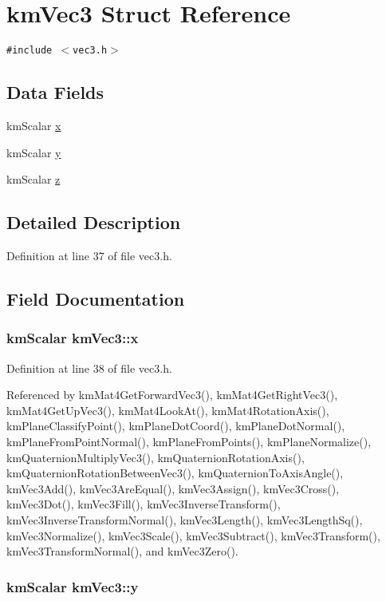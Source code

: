 \hypertarget{structkm_vec3}{
\section{kmVec3 Struct Reference}
\label{structkm_vec3}
}
{\tt \#include $<$vec3.h$>$}

\subsection*{Data Fields}
\begin{CompactItemize}
\item 
kmScalar \hyperlink{structkm_vec3_800c3571e905feddc73453c652be72fb}{x}
\item 
kmScalar \hyperlink{structkm_vec3_45906c9d76262c5a9dd1c3774ee937eb}{y}
\item 
kmScalar \hyperlink{structkm_vec3_539514eaeee81aaeee3bb90f7a1581af}{z}
\end{CompactItemize}


\subsection{Detailed Description}


Definition at line 37 of file vec3.h.

\subsection{Field Documentation}
\hypertarget{structkm_vec3_800c3571e905feddc73453c652be72fb}{
\subsubsection[{x}]{\setlength{\rightskip}{0pt plus 5cm}kmScalar {\bf kmVec3::x}}}
\label{structkm_vec3_800c3571e905feddc73453c652be72fb}




Definition at line 38 of file vec3.h.

Referenced by kmMat4GetForwardVec3(), kmMat4GetRightVec3(), kmMat4GetUpVec3(), kmMat4LookAt(), kmMat4RotationAxis(), kmPlaneClassifyPoint(), kmPlaneDotCoord(), kmPlaneDotNormal(), kmPlaneFromPointNormal(), kmPlaneFromPoints(), kmPlaneNormalize(), kmQuaternionMultiplyVec3(), kmQuaternionRotationAxis(), kmQuaternionRotationBetweenVec3(), kmQuaternionToAxisAngle(), kmVec3Add(), kmVec3AreEqual(), kmVec3Assign(), kmVec3Cross(), kmVec3Dot(), kmVec3Fill(), kmVec3InverseTransform(), kmVec3InverseTransformNormal(), kmVec3Length(), kmVec3LengthSq(), kmVec3Normalize(), kmVec3Scale(), kmVec3Subtract(), kmVec3Transform(), kmVec3TransformNormal(), and kmVec3Zero().\hypertarget{structkm_vec3_45906c9d76262c5a9dd1c3774ee937eb}{
\subsubsection[{y}]{\setlength{\rightskip}{0pt plus 5cm}kmScalar {\bf kmVec3::y}}}
\label{structkm_vec3_45906c9d76262c5a9dd1c3774ee937eb}




